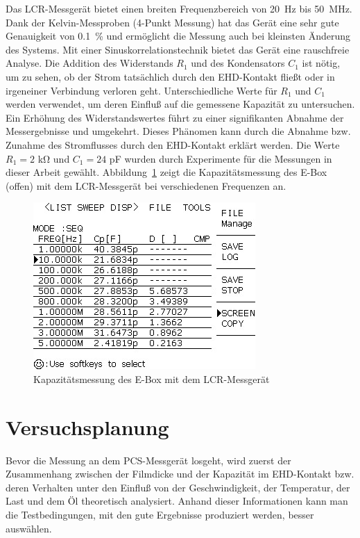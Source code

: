 Das LCR-Messgerät bietet einen breiten Frequenzbereich von \SI{20}{\Hz} bis \SI{50}{\MHz}.
Dank der Kelvin-Messproben (4-Punkt Messung) hat das Gerät eine sehr gute Genauigkeit von \SI{0.1}{\percent} und ermöglicht die Messung auch bei kleinsten Änderung des Systems.
Mit einer Sinuskorrelationstechnik bietet das Gerät eine rauschfreie Analyse.
Die Addition des Widerstands $R_1$ und des Kondensators $C_1$ ist nötig, um zu sehen, ob der Strom tatsächlich durch den EHD-Kontakt fließt oder in irgeneiner Verbindung verloren geht.
Unterschiedliche Werte für $R_1$ und $C_1$ werden verwendet, um deren Einfluß auf die gemessene Kapazität zu untersuchen.
Ein Erhöhung des Widerstandswertes führt zu einer signifikanten Abnahme der Messergebnisse und umgekehrt.
Dieses Phänomen kann durch die Abnahme bzw. Zunahme des Stromflusses durch den EHD-Kontakt erklärt werden.
Die Werte $R_1 = 2$ \si{\kilo\ohm} und $C_1 = 24$ \si{\pico\farad} wurden durch Experimente für die Messungen in dieser Arbeit gewählt.
Abbildung~\ref{fig:lcr_ebox_capacitance} zeigt die Kapazitätsmessung des E-Box (offen) mit dem LCR-Messgerät bei verschiedenen Frequenzen an.

\begin{figure}[htb]
    \centering
    \includegraphics[width=0.5\linewidth]{./images/lcr_ebox_capacitance.jpg}
    \caption{Kapazitätsmessung des E-Box mit dem LCR-Messgerät}
    \label{fig:lcr_ebox_capacitance}
\end{figure}

\section{Versuchsplanung}
\label{sec:versuchsplanung}

Bevor die Messung an dem PCS-Messgerät losgeht, wird zuerst der Zusammenhang zwischen der Filmdicke und der Kapazität im EHD-Kontakt bzw. deren Verhalten unter den Einfluß von der Geschwindigkeit, der Temperatur, der Last und dem Öl theoretisch analysiert.
Anhand dieser Informationen kann man die Testbedingungen, mit den gute Ergebnisse produziert werden, besser auswählen.

